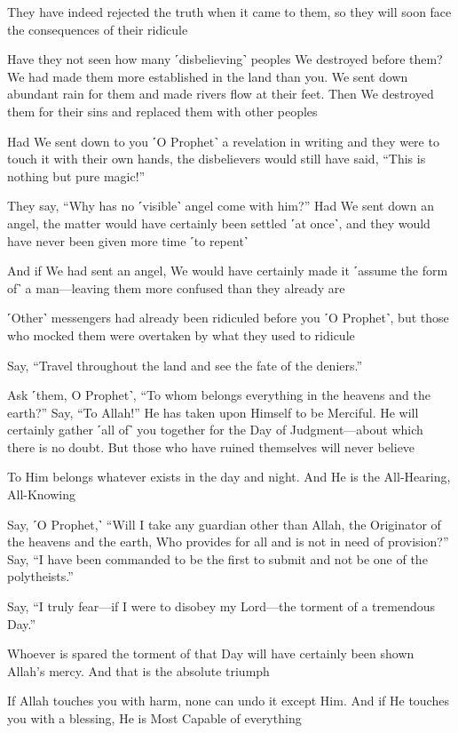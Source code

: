 They have indeed rejected the truth when it came to them, so they will soon face the consequences of their ridicule

Have they not seen how many ˹disbelieving˺ peoples We destroyed before them? We had made them more established in the land than you. We sent down abundant rain for them and made rivers flow at their feet. Then We destroyed them for their sins and replaced them with other peoples

Had We sent down to you ˹O Prophet˺ a revelation in writing and they were to touch it with their own hands, the disbelievers would still have said, “This is nothing but pure magic!”

They say, “Why has no ˹visible˺ angel come with him?” Had We sent down an angel, the matter would have certainly been settled ˹at once˺, and they would have never been given more time ˹to repent˺

And if We had sent an angel, We would have certainly made it ˹assume the form of˺ a man—leaving them more confused than they already are

˹Other˺ messengers had already been ridiculed before you ˹O Prophet˺, but those who mocked them were overtaken by what they used to ridicule

Say, “Travel throughout the land and see the fate of the deniers.”

Ask ˹them, O Prophet˺, “To whom belongs everything in the heavens and the earth?” Say, “To Allah!” He has taken upon Himself to be Merciful. He will certainly gather ˹all of˺ you together for the Day of Judgment—about which there is no doubt. But those who have ruined themselves will never believe

To Him belongs whatever exists in the day and night. And He is the All-Hearing, All-Knowing

Say, ˹O Prophet,˺ “Will I take any guardian other than Allah, the Originator of the heavens and the earth, Who provides for all and is not in need of provision?” Say, “I have been commanded to be the first to submit and not be one of the polytheists.”

Say, “I truly fear—if I were to disobey my Lord—the torment of a tremendous Day.”

Whoever is spared the torment of that Day will have certainly been shown Allah’s mercy. And that is the absolute triumph

If Allah touches you with harm, none can undo it except Him. And if He touches you with a blessing, He is Most Capable of everything

